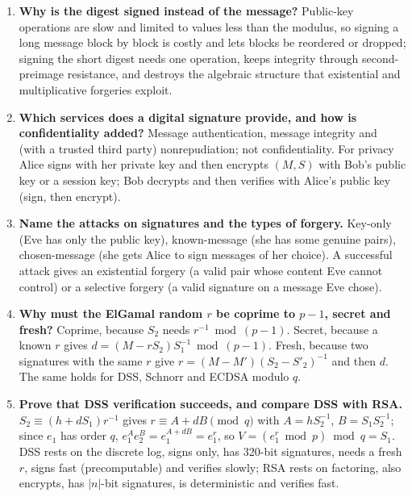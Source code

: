 \begin{enumerate}[leftmargin=1.6em,itemsep=3pt]
  \item \textbf{Why is the digest signed instead of the message?} Public-key operations are slow and limited to values less than the modulus, so signing a long message block by block is costly and lets blocks be reordered or dropped; signing the short digest needs one operation, keeps integrity through second-preimage resistance, and destroys the algebraic structure that existential and multiplicative forgeries exploit.
  \item \textbf{Which services does a digital signature provide, and how is confidentiality added?} Message authentication, message integrity and (with a trusted third party) nonrepudiation; not confidentiality. For privacy Alice signs with her private key and then encrypts $(M, S)$ with Bob's public key or a session key; Bob decrypts and then verifies with Alice's public key (sign, then encrypt).
  \item \textbf{Name the attacks on signatures and the types of forgery.} Key-only (Eve has only the public key), known-message (she has some genuine pairs), chosen-message (she gets Alice to sign messages of her choice). A successful attack gives an existential forgery (a valid pair whose content Eve cannot control) or a selective forgery (a valid signature on a message Eve chose).
  \item \textbf{Why must the ElGamal random $r$ be coprime to $p - 1$, secret and fresh?} Coprime, because $S_2$ needs $r^{-1} \bmod (p-1)$. Secret, because a known $r$ gives $d = (M - rS_2)S_1^{-1} \bmod (p-1)$. Fresh, because two signatures with the same $r$ give $r = (M - M')(S_2 - S'_2)^{-1}$ and then $d$. The same holds for DSS, Schnorr and ECDSA modulo $q$.
  \item \textbf{Prove that DSS verification succeeds, and compare DSS with RSA.} $S_2 \equiv (h + dS_1) r^{-1}$ gives $r \equiv A + dB \pmod q$ with $A = hS_2^{-1}$, $B = S_1S_2^{-1}$; since $e_1$ has order $q$, $e_1^A e_2^B = e_1^{A + dB} = e_1^r$, so $V = (e_1^r \bmod p) \bmod q = S_1$. DSS rests on the discrete log, signs only, has 320-bit signatures, needs a fresh $r$, signs fast (precomputable) and verifies slowly; RSA rests on factoring, also encrypts, has $|n|$-bit signatures, is deterministic and verifies fast.
\end{enumerate}

